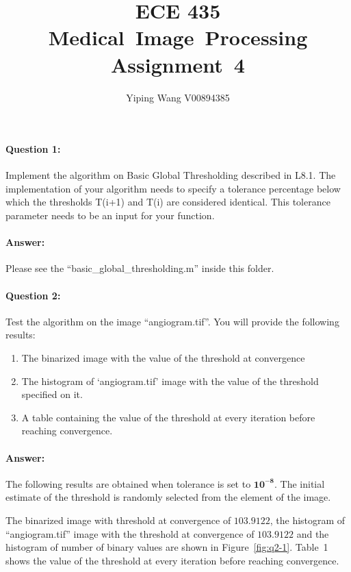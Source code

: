 \documentclass[12pt, letter]{article}
\newcommand{\courseName}{ECE 435 Medical~Image~Processing}
\newcommand{\assignName}{Assignment~4}
\begin{document}
\pagestyle{titlesec_assignment}

\title{\courseName\\\assignName}
\author{Yiping Wang V00894385}
\maketitle

\paragraph{Question 1: } Implement the algorithm on Basic Global Thresholding described in L8.1. The implementation of your algorithm needs to specify a tolerance percentage below which the thresholds T(i+1) and T(i) are considered identical. This tolerance parameter needs to be an input for your function.

\paragraph{Answer: } Please see the ``basic\_global\_thresholding.m'' inside this folder. 


\paragraph{Question 2:} Test the algorithm on the image ``angiogram.tif''. You will provide the following results:
\begin{enumerate}
    \item The binarized image with the value of the threshold at convergence
    \item The histogram of ‘angiogram.tif’ image with the value of the threshold specified on it.
    \item A table containing the value of the threshold at every iteration before reaching convergence.
\end{enumerate}

\paragraph{Answer:}
The following results are obtained when tolerance is set to $\mathbf{10^{-8}}$. The initial estimate of the threshold is randomly selected from the element of the image.  

The binarized image with threshold at convergence of $\mathbf{103.9122}$, the histogram of ``angiogram.tif'' image with the threshold at convergence of $\mathbf{103.9122}$ and the histogram of number of binary values are shown in Figure~\ref{fig:q2-1}. Table~1 shows the value of the threshold at every iteration before reaching convergence.
\end{document}
